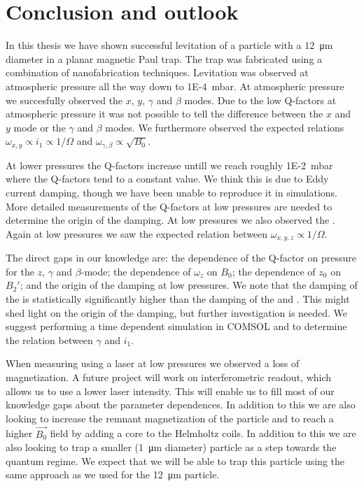 \chapter{Conclusion and outlook}
\label{chap:conclusion}
In this thesis we have shown successful levitation of a  particle with a \qty{12}{\micro\meter} diameter in a planar magnetic Paul trap. The trap was fabricated using a combination of nanofabrication techniques. Levitation was observed at atmospheric pressure all the way down to \qty{1E-4}{\milli\bar}. At atmospheric pressure we succesfully observed the $x$, $y$, $\gamma$ and $\beta$ modes. Due to the low Q-factors at atmospheric pressure it was not possible to tell the difference between the $x$ and $y$ mode or the $\gamma$ and $\beta$ modes. We furthermore observed the expected relations $\omega_{x,y} \propto i_1 \propto 1/\Omega$ and $\omega_{\gamma,\beta} \propto \sqrt{B_0}$.

At lower pressures the Q-factors increase untill we reach roughly \qty{1E-2}{\milli\bar} where the Q-factors tend to a constant value. We think this is due to Eddy current damping, though we have been unable to reproduce it in simulations. More detailed measurements of the Q-factors at low pressures are needed to determine the origin of the damping. At low pressures we also observed the \zmode. Again at low pressures we saw the expected relation between $\omega_{x,y,z} \propto 1/\Omega$.

The direct gaps in our knowledge are: the dependence of the Q-factor on pressure for the $z$, $\gamma$ and $\beta$-mode; the dependence of $\omega_z$ on $B_0$; the dependence of $z_0$ on $B_2'$; and the origin of the damping at low pressures. We note that the damping of the \zmode is statistically significantly higher than the damping of the \xmode and \ymode. This might shed light on the origin of the damping, but further investigation is needed. We suggest performing a time dependent simulation in COMSOL and to determine the relation between $\gamma$ and $i_1$.

When measuring using a laser at low pressures we observed a loss of magnetization. A future project will work on interferometric readout, which allows us to use a lower laser intensity. This will enable us to fill most of our knowledge gaps about the parameter dependences. In addition to this we are also looking to increase the remnant magnetization of the particle and to reach a higher $\vec{B_0}$ field by adding a core to the Helmholtz coils. In addition to this we are also looking to trap a smaller (\qty{1}{\micro\meter} diameter) particle as a step towards the quantum regime. We expect that we will be able to trap this particle using the same approach as we used for the \qty{12}{\micro\meter} particle.

